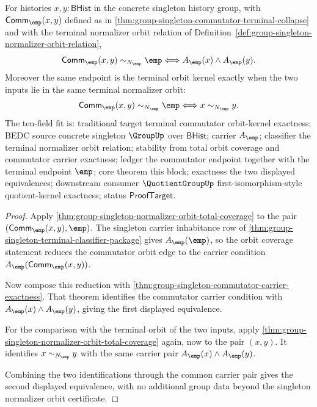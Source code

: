 \begin{theorem}
\label{thm:group-singleton-commutator-orbit-kernel-exactness}
For histories $x,y:\mathsf{BHist}$ in the concrete singleton history group, with
$\mathsf{Comm}_{\emp}(x,y)$ defined as in
\autoref{thm:group-singleton-commutator-terminal-collapse} and with the
terminal normalizer orbit relation of
Definition~\ref{def:group-singleton-normalizer-orbit-relation},
$$
\mathsf{Comm}_{\emp}(x,y)\sim_{N_{\emp}}\emp
\Longleftrightarrow A_{\emp}(x)\land A_{\emp}(y).
$$
Moreover the same endpoint is the terminal orbit kernel exactly when the two
inputs lie in the same terminal normalizer orbit:
$$
\mathsf{Comm}_{\emp}(x,y)\sim_{N_{\emp}}\emp
\Longleftrightarrow x\sim_{N_{\emp}}y.
$$
The ten-field fit is: traditional target terminal commutator orbit-kernel
exactness; BEDC source concrete singleton $\GroupUp$ over $\mathsf{BHist}$;
carrier $A_{\emp}$; classifier the terminal normalizer orbit relation;
stability from total orbit coverage and commutator carrier exactness; ledger
the commutator endpoint together with the terminal endpoint $\emp$; core theorem
this block; exactness the two displayed equivalences; downstream consumer
$\QuotientGroupUp$ first-isomorphism-style quotient-kernel exactness; status
$\mathsf{ProofTarget}$.
\end{theorem}
\begin{proof}
Apply \autoref{thm:group-singleton-normalizer-orbit-total-coverage} to the pair
$(\mathsf{Comm}_{\emp}(x,y),\emp)$. The singleton carrier inhabitance row of
\autoref{thm:group-singleton-terminal-classifier-package} gives
$A_{\emp}(\emp)$, so the orbit coverage statement reduces the commutator orbit
edge to the carrier condition $A_{\emp}(\mathsf{Comm}_{\emp}(x,y))$.

Now compose this reduction with
\autoref{thm:group-singleton-commutator-carrier-exactness}. That theorem
identifies the commutator carrier condition with
$A_{\emp}(x)\land A_{\emp}(y)$, giving the first displayed equivalence.

For the comparison with the terminal orbit of the two inputs, apply
\autoref{thm:group-singleton-normalizer-orbit-total-coverage} again, now to
the pair $(x,y)$. It identifies $x\sim_{N_{\emp}}y$ with the same carrier pair
$A_{\emp}(x)\land A_{\emp}(y)$.

Combining the two identifications through the common carrier pair gives the
second displayed equivalence, with no additional group data beyond the
singleton normalizer orbit certificate.
\end{proof}

